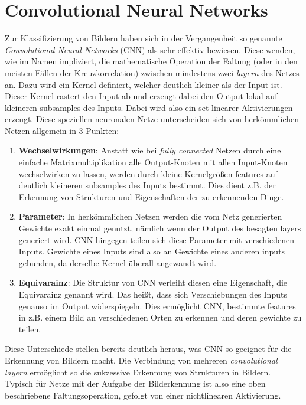 \chapter{Convolutional Neural Networks}\label{sec:netze}

Zur Klassifizierung von Bildern haben sich in der Vergangenheit so genannte
\textit{Convolutional Neural Networks} (CNN) als sehr effektiv bewiesen.
Diese wenden, wie im Namen impliziert, die mathematische Operation der Faltung
(oder in den meisten Fällen der Kreuzkorrelation) zwischen mindestens zwei
\textit{layern} des Netzes an.
Dazu wird ein Kernel definiert, welcher deutlich kleiner als der Input ist.
Dieser Kernel rastert den Input ab und erzeugt dabei den Output lokal auf
kleineren subsamples des Inputs. Dabei wird also ein set linearer Aktivierungen
erzeugt.
Diese speziellen neuronalen Netze unterscheiden sich von herkömmlichen Netzen
allgemein in 3 Punkten:
%
\begin{enumerate}
  \item \textbf{Wechselwirkungen}: Anstatt wie bei \textit{fully connected}
  Netzen durch eine einfache Matrixmultiplikation alle Output-Knoten mit allen
  Input-Knoten wechselwirken zu lassen, werden durch kleine Kernelgrößen
  features auf deutlich kleineren subsamples des Inputs bestimmt. Dies dient
  z.B. der Erkennung von Strukturen und Eigenschaften der zu erkennenden Dinge.
  \item \textbf{Parameter}: In herkömmlichen Netzen werden die vom Netz
  generierten Gewichte exakt einmal genutzt, nämlich wenn der Output des
  besagten layers generiert wird. CNN hingegen teilen sich diese Parameter mit
  verschiedenen Inputs. Gewichte eines Inputs sind also an Gewichte eines
  anderen inputs gebunden, da derselbe Kernel überall angewandt wird.
  \item \textbf{Equivarainz}: Die Struktur von CNN verleiht diesen eine
  Eigenschaft, die Equivarainz genannt wird. Das heißt, dass sich
  Verschiebungen des Inputs genauso im Output widerspiegeln. Dies ermöglicht
  CNN, bestimmte features in z.B. einem Bild an verschiedenen Orten zu erkennen
  und deren gewichte zu teilen.
\end{enumerate}
%
Diese Unterschiede stellen bereits deutlich heraus, was CNN so geeignet für die
Erkennung von Bildern macht. Die Verbindung von mehreren \textit{convolutional
layern} ermöglicht so die sukzessive Erkennung von Strukturen in Bildern. \\
Typisch für Netze mit der Aufgabe der Bilderkennung ist also eine oben
beschriebene Faltungsoperation, gefolgt von einer nichtlinearen Aktivierung.
